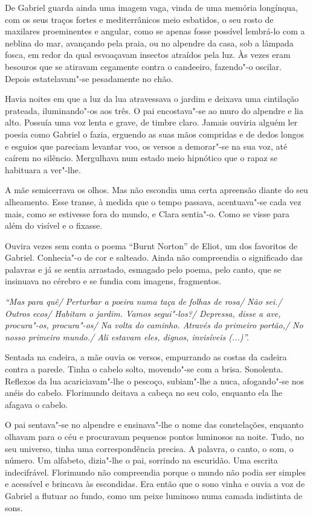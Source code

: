De Gabriel guarda ainda uma imagem vaga, vinda de uma memória longínqua,
com os seus traços fortes e mediterrânicos meio esbatidos, o seu rosto
de maxilares proeminentes e angular, como se apenas fosse possível
lembrá-lo com a neblina do mar, avançando pela praia, ou no alpendre da
casa, sob a lâmpada fosca, em redor da qual esvoaçavam insectos atraídos
pela luz. Às vezes eram besouros que se atiravam cegamente contra o
candeeiro, fazendo"-o oscilar. Depois estatelavam"-se pesadamente no chão.

Havia noites em que a luz da lua atravessava o jardim e deixava uma
cintilação prateada, iluminando"-os aos três. O pai encostava"-se ao muro
do alpendre e lia alto. Possuía uma voz lenta e grave, de timbre claro.
Jamais ouviria alguém ler poesia como Gabriel o fazia, erguendo as suas
mãos compridas e de dedos longos e esguios que pareciam levantar voo, os
versos a demorar"-se na sua voz, até caírem no silêncio. Mergulhava num
estado meio hipnótico que o rapaz se habituara a ver"-lhe.

A mãe semicerrava os olhos. Mas não escondia uma certa apreensão diante
do seu alheamento. Esse transe, à medida que o tempo passava,
acentuava"-se cada vez mais, como se estivesse fora do mundo, e Clara
sentia"-o. Como se visse para além do visível e o fixasse.

Ouvira vezes sem conta o poema ``Burnt Norton'' de Eliot, um dos
favoritos de Gabriel. Conhecia"-o de cor e salteado. Ainda não
compreendia o significado das palavras e já se sentia arrastado,
esmagado pelo poema, pelo canto, que se insinuava no cérebro e se fundia
com imagens, fragmentos.

\emph{``Mas para quê/ Perturbar a poeira numa taça de folhas de rosa/
Não sei./ Outros ecos/ Habitam o jardim. Vamos segui"-los?/ Depressa,
disse a ave, procura"-os, procura"-os/ Na volta do caminho. Através do
primeiro portão,/ No nosso primeiro mundo./ Ali estavam eles, dignos,
invisíveis (...)''.}

Sentada na cadeira, a mãe ouvia os versos, empurrando as costas da
cadeira contra a parede. Tinha o cabelo solto, movendo"-se com a brisa.
Sonolenta. Reflexos da lua acariciavam"-lhe o pescoço, subiam"-lhe a nuca,
afogando"-se nos anéis do cabelo. Florimundo deitava a cabeça no seu
colo, enquanto ela lhe afagava o cabelo.

O pai sentava"-se no alpendre e ensinava"-lhe o nome das constelações,
enquanto olhavam para o céu e procuravam pequenos pontos luminosos na
noite. Tudo, no seu universo, tinha uma correspondência precisa. A
palavra, o canto, o som, o número. Um alfabeto, dizia"-lhe o pai,
sorrindo na escuridão. Uma escrita indecifrável. Florimundo não
compreendia porque o mundo não podia ser simples e acessível e brincava
às escondidas. Era então que o sono vinha e ouvia a voz de Gabriel a
flutuar ao fundo, como um peixe luminoso numa camada indistinta de sons.

